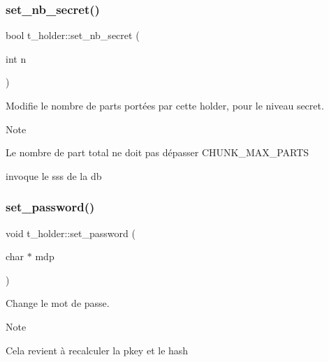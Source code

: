 \subsubsection{\texorpdfstring{set\+\_\+nb\+\_\+secret()}{set\_nb\_secret()}}
{\footnotesize\ttfamily bool t\+\_\+holder\+::set\+\_\+nb\+\_\+secret (\begin{DoxyParamCaption}\item[{int}]{n }\end{DoxyParamCaption})}



Modifie le nombre de parts portées par cette holder, pour le niveau secret. 

\begin{DoxyNote}{Note}

\begin{DoxyItemize}
\item Le nombre de part total ne doit pas dépasser C\+H\+U\+N\+K\+\_\+\+M\+A\+X\+\_\+\+P\+A\+R\+TS
\item invoque le sss de la db 
\end{DoxyItemize}
\end{DoxyNote}
\mbox{\label{classt__holder_a08e5c20156dba916f67fb2861d0a79be}} 
\subsubsection{\texorpdfstring{set\+\_\+password()}{set\_password()}}
{\footnotesize\ttfamily void t\+\_\+holder\+::set\+\_\+password (\begin{DoxyParamCaption}\item[{char $\ast$}]{mdp }\end{DoxyParamCaption})}



Change le mot de passe. 

\begin{DoxyNote}{Note}

\begin{DoxyItemize}
\item Cela revient à recalculer la pkey et le hash 
\end{DoxyItemize}
\end{DoxyNote}
\mbox{\label{classt__holder_a0c5f8f994532f9bdf72f870d9c66e2b1}} 
